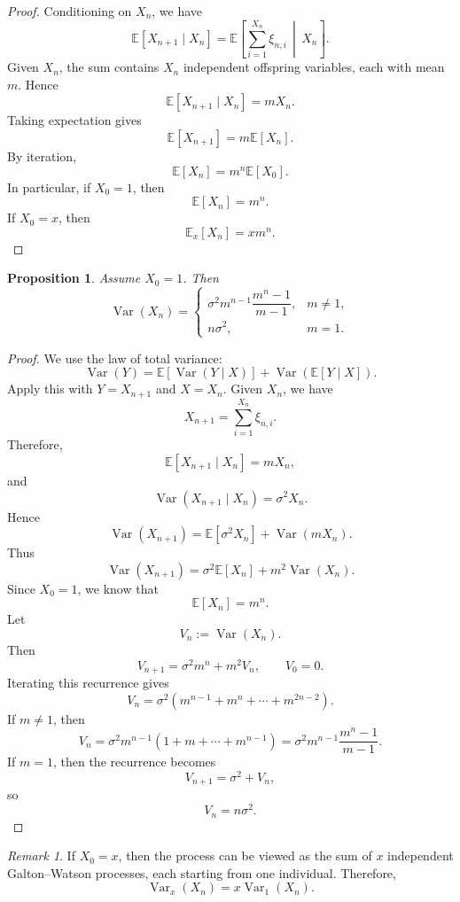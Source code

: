 \documentclass[11pt]{article}
\theoremstyle{plain}
\newtheorem{proposition}[theorem]{Proposition}
\theoremstyle{definition}
\theoremstyle{remark}
\newtheorem{remark}[theorem]{Remark}
\begin{document}
	\begin{proof}
		Conditioning on \(X_n\), we have
		\[
		\mathbb{E}[X_{n+1}\mid X_n]
		=
		\mathbb{E}\left[\sum_{i=1}^{X_n}\xi_{n,i}\,\middle|\,X_n\right].
		\]
		Given \(X_n\), the sum contains \(X_n\) independent offspring variables, each with mean \(m\). Hence
		\[
		\mathbb{E}[X_{n+1}\mid X_n]
		=
		mX_n.
		\]
		Taking expectation gives
		\[
		\mathbb{E}[X_{n+1}]
		=
		m\mathbb{E}[X_n].
		\]
		By iteration,
		\[
		\mathbb{E}[X_n]
		=
		m^n\mathbb{E}[X_0].
		\]
		In particular, if \(X_0=1\), then
		\[
		\mathbb{E}[X_n]=m^n.
		\]
		If \(X_0=x\), then
		\[
		\mathbb{E}_x[X_n]=xm^n.
		\]
	\end{proof}
	
	\begin{proposition}
		Assume \(X_0=1\). Then
		\[
		\operatorname{Var}(X_n)
		=
		\begin{cases}
			\sigma^2m^{n-1}\dfrac{m^n-1}{m-1},
			& m\neq 1,\\[12pt]
			n\sigma^2,
			& m=1.
		\end{cases}
		\]
	\end{proposition}
	
	\begin{proof}
		We use the law of total variance:
		\[
		\operatorname{Var}(Y)
		=
		\mathbb{E}[\operatorname{Var}(Y\mid X)]
		+
		\operatorname{Var}(\mathbb{E}[Y\mid X]).
		\]
		Apply this with \(Y=X_{n+1}\) and \(X=X_n\). Given \(X_n\), we have
		\[
		X_{n+1}
		=
		\sum_{i=1}^{X_n}\xi_{n,i}.
		\]
		Therefore,
		\[
		\mathbb{E}[X_{n+1}\mid X_n]
		=
		mX_n,
		\]
		and
		\[
		\operatorname{Var}(X_{n+1}\mid X_n)
		=
		\sigma^2X_n.
		\]
		Hence
		\[
		\operatorname{Var}(X_{n+1})
		=
		\mathbb{E}[\sigma^2X_n]
		+
		\operatorname{Var}(mX_n).
		\]
		Thus
		\[
		\operatorname{Var}(X_{n+1})
		=
		\sigma^2\mathbb{E}[X_n]
		+
		m^2\operatorname{Var}(X_n).
		\]
		Since \(X_0=1\), we know that
		\[
		\mathbb{E}[X_n]=m^n.
		\]
		Let
		\[
		V_n:=\operatorname{Var}(X_n).
		\]
		Then
		\[
		V_{n+1}
		=
		\sigma^2m^n+m^2V_n,
		\qquad
		V_0=0.
		\]
		Iterating this recurrence gives
		\[
		V_n
		=
		\sigma^2
		\left(
		m^{n-1}+m^n+\cdots+m^{2n-2}
		\right).
		\]
		If \(m\neq 1\), then
		\[
		V_n
		=
		\sigma^2m^{n-1}
		\left(
		1+m+\cdots+m^{n-1}
		\right)
		=
		\sigma^2m^{n-1}\frac{m^n-1}{m-1}.
		\]
		If \(m=1\), then the recurrence becomes
		\[
		V_{n+1}=\sigma^2+V_n,
		\]
		so
		\[
		V_n=n\sigma^2.
		\]
	\end{proof}
	
	\begin{remark}
		If \(X_0=x\), then the process can be viewed as the sum of \(x\) independent Galton--Watson processes, each starting from one individual. Therefore,
		\[
		\operatorname{Var}_x(X_n)
		=
		x\operatorname{Var}_1(X_n).
		\]
	\end{remark}
	
\end{document}
